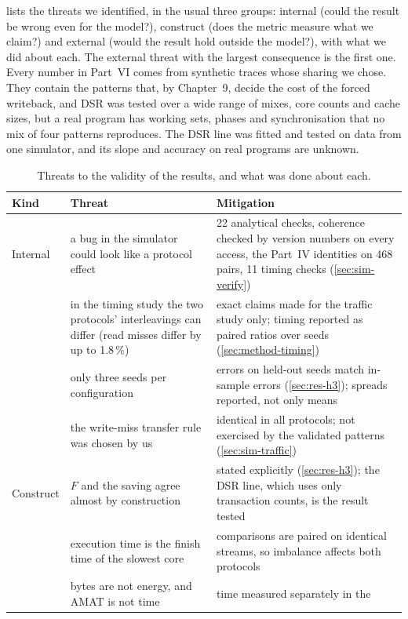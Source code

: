  lists the threats we identified, in the usual three groups:
internal (could the result be wrong even for the model?), construct (does the
metric measure what we claim?) and external (would the result hold outside the
model?), with what we did about each. The external threat with the largest
consequence is the first one. Every number in Part~VI comes from synthetic traces
whose sharing we chose. They contain the patterns that, by Chapter~9, decide the
cost of the forced writeback, and DSR was tested over a wide range of mixes, core
counts and cache sizes, but a real program has working sets, phases and
synchronisation that no mix of four patterns reproduces. The DSR line was fitted and
tested on data from one simulator, and its slope and accuracy on real programs are
unknown.

\begin{table}[htbp]
\centering
\caption{Threats to the validity of the results, and what was done about each.}
\label{tab:threats}
\footnotesize
\begin{tabular}{@{}L{1.5cm} L{4.6cm} L{6.6cm}@{}}
\toprule
Kind & Threat & Mitigation \\
\midrule
Internal & a bug in the simulator could look like a protocol effect &
  22 analytical checks, coherence checked by version numbers on every access,
  the Part~IV identities on 468 pairs, 11 timing checks (\cref{sec:sim-verify}) \\
 & in the timing study the two protocols' interleavings can differ (read
  misses differ by up to 1.8\,\%) & exact claims made for the traffic study only;
  timing reported as paired ratios over seeds (\cref{sec:method-timing}) \\
 & only three seeds per configuration & errors on held-out seeds match in-sample
  errors (\cref{sec:res-h3}); spreads reported, not only means \\
 & the write-miss transfer rule was chosen by us & identical in all protocols;
  not exercised by the validated patterns (\cref{sec:sim-traffic}) \\
\midrule
Construct & $F$ and the saving agree almost by construction &
  stated explicitly (\cref{sec:res-h3}); the DSR line, which uses only
  transaction counts, is the result tested \\
 & execution time is the finish time of the slowest core & comparisons are
  paired on identical streams, so imbalance affects both protocols \\
 & bytes are not energy, and AMAT is not time & time measured separately in the

\end{tabular}
\end{table}
